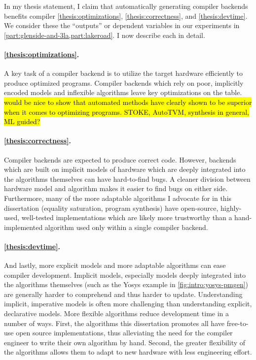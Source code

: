 \vspace{10mm}

In my thesis statement,
  I claim that automatically generating
  compiler backends
  benefits compiler
  \cref{thesis:optimizations},
  \cref{thesis:correctness}, and
  \cref{thesis:devtime}.
We consider these the ``outputs''
  or dependent variables
  in our experiments
  in \cref{part:glenside-and-3la,part:lakeroad}.
I now describe each in detail.

\paragraph{\cref{thesis:optimizations}.}
A key task of a compiler backend
  is to utilize the target hardware
  efficiently
  to produce optimized programs.
Compiler backends which rely on poor,
  implicitly encoded models
  and inflexible algorithms
  leave key optimizations on the table.
\hl{would be nice to show that automated methods have clearly shown
  to be superior when it comes to optimizing programs.
  STOKE, AutoTVM, synthesis in general, ML guided?}

\paragraph{\cref{thesis:correctness}.}
Compiler backends are expected to produce correct code.
However,
  backends which are built on
  implicit models of hardware
  which are deeply integrated into
  the algorithms themselves
  can have hard-to-find bugs.
A cleaner division between hardware model
  and algorithm
  makes it easier to find bugs on either side.
Furthermore, many of the
  more adaptable algorithms
  I advocate for in this dissertation
  (equality saturation, program synthesis)
  have open-source, highly-used, well-tested
  implementations
  which are likely more trustworthy
  than a hand-implemented
  algorithm used only within
  a single compiler backend.

\paragraph{\cref{thesis:devtime}.}
And lastly,
  more explicit models
  and more adaptable algorithms
  can ease compiler development.
Implicit models,
  especially models deeply integrated
  into the algorithms themselves
  (such as the Yosys example
    in \cref{fig:intro:yosys-pmgen})
  are generally harder to comprehend
  and thus harder to update.
Understanding implicit,
  imperative models
  is often more challenging
  than understanding explicit,
  declarative models.
More flexible algorithms
  reduce development time in a number of ways.
First, the algorithms
  this dissertation promotes
  all have free-to-use open source 
  implementations,
  thus alleviating the need
  for the compiler engineer
  to write their own algorithm by hand.
Second, the greater flexibility
  of the algorithms
  allows them to adapt to new
  hardware
  with less engineering effort.

